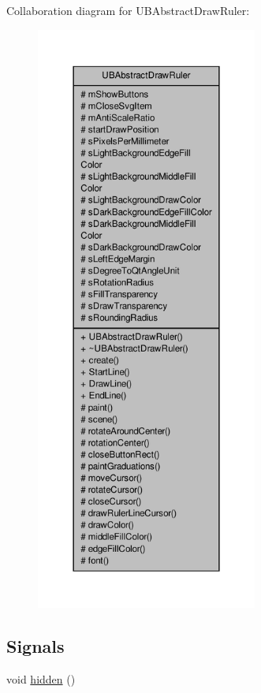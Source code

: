 Collaboration diagram for U\-B\-Abstract\-Draw\-Ruler\-:
\nopagebreak
\begin{figure}[H]
\begin{center}
\leavevmode
\includegraphics[height=550pt]{dc/d62/class_u_b_abstract_draw_ruler__coll__graph}
\end{center}
\end{figure}
\subsection*{Signals}
\begin{DoxyCompactItemize}
\item 
void \hyperlink{class_u_b_abstract_draw_ruler_a4115b2260e92b3da0529278ef89a1560}{hidden} ()
\end{DoxyCompactItemize}
